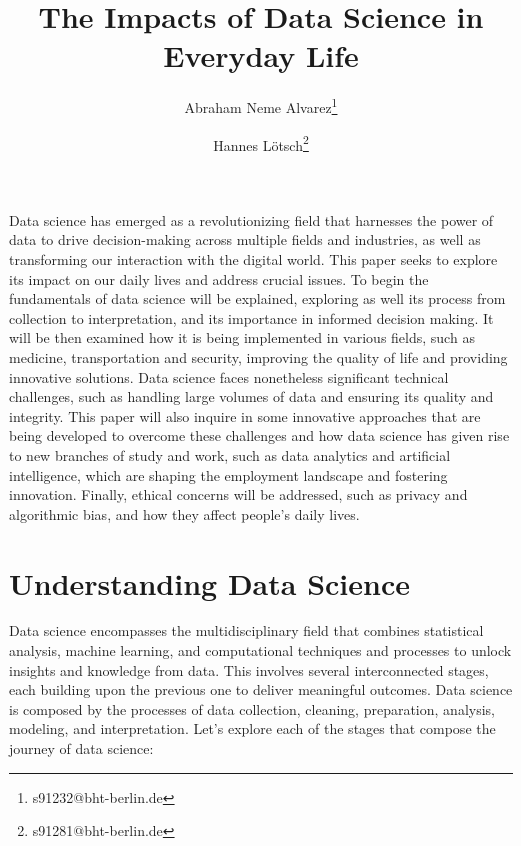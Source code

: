 \documentclass{vgtc}                          %
\title{The Impacts of Data Science in Everyday Life}
\author{Abraham Neme Alvarez\thanks{s91232@bht-berlin.de}
\and Hannes Lötsch\thanks{s91281@bht-berlin.de}}
\affiliation{\scriptsize Berliner Hochschule für Technik}
\begin{document}


\maketitle

Data science has emerged as a revolutionizing field that harnesses the power of data to drive decision-making across multiple fields and industries, as 
well as transforming our interaction with the digital world. This paper seeks to explore its impact on our daily lives and address crucial issues. To begin 
the fundamentals of data science will be explained, exploring as well its process from collection to interpretation, and its importance in informed decision 
making. It will be then examined how it is being implemented in various fields, such as medicine, transportation and security, improving the quality of life 
and providing innovative solutions. Data science faces nonetheless significant technical challenges, such as handling large volumes of data and ensuring its 
quality and integrity. This paper will also inquire in some innovative approaches that are being developed to overcome these challenges and how data science 
has given rise to new branches of study and work, such as data analytics and artificial intelligence, which are shaping the employment landscape and fostering 
innovation. Finally, ethical concerns will be addressed, such as privacy and algorithmic bias, and how they affect people's daily lives.

\section{Understanding Data Science}

Data science encompasses the multidisciplinary field that combines statistical analysis, machine learning, and computational techniques and processes 
to unlock insights and knowledge from data. This involves several interconnected stages, each building upon the previous one to deliver meaningful outcomes. 
Data science is composed by the processes of data collection, cleaning, preparation, analysis, modeling, and interpretation. Let's explore each of the 
stages that compose the journey of data science:
\end{document}
